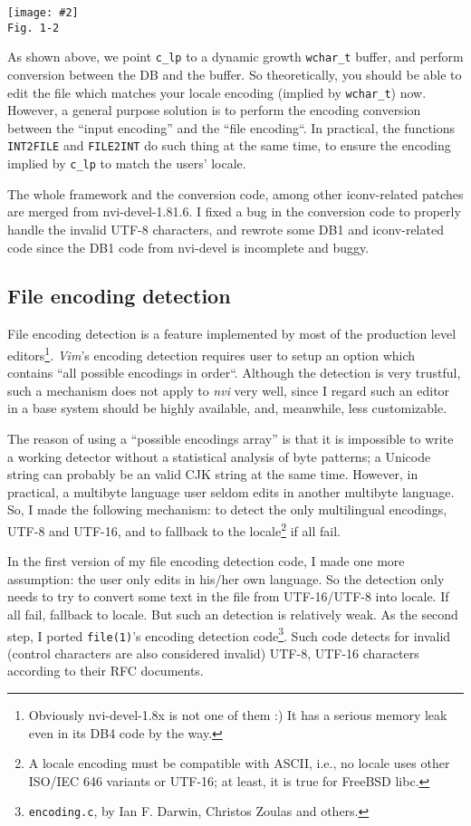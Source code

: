 \documentclass[11pt,twoside,a4paper]{article}
\newcommand{\fig}[3]{
	\begin{center}
	\texttt{[image: \#2]}\\
	\texttt{\small{Fig. #1}}
	\end{center}}
\begin{document}
\begin{mla}
\fig{1-2}{exf_2}{0.5}

As shown above, we point \verb|c_lp| to a dynamic growth \verb|wchar_t|
buffer, and perform conversion between the DB and the buffer. So
theoretically, you should be able to edit the file which matches your
locale encoding (implied by \verb|wchar_t|) now. However, a general purpose
solution is to perform the encoding conversion between the ``input encoding''
and the ``file encoding``. In practical, the functions \verb|INT2FILE|
and \verb|FILE2INT| do such thing at the same time, to ensure the encoding
implied by \verb|c_lp| to match the users' locale.

The whole framework and the conversion code, among other iconv-related patches
are merged from nvi-devel-1.81.6. I fixed a bug in the conversion code to
properly handle the invalid UTF-8 characters, and rewrote some DB1 and
iconv-related code since the DB1 code from nvi-devel is incomplete and buggy.

\subsection{File encoding detection}

File encoding detection is a feature implemented by most of the production
level editors\footnote{Obviously nvi-devel-1.8x is not one of them :) It has
a serious memory leak even in its DB4 code by the way.}.
\emph{Vim}'s encoding detection requires user to setup an option which
contains ``all possible encodings in order``. Although the detection is very
trustful, such a mechanism does not apply to \emph{nvi} very well, since I
regard such an editor in a base system should be highly available, and,
meanwhile, less customizable.

The reason of using a ``possible encodings array'' is that it is impossible
to write a working detector without a statistical analysis of byte patterns;
a Unicode string can probably be an valid CJK string at the same time.
However, in practical, a multibyte language user seldom edits in another
multibyte language. So, I made the following mechanism: to detect the only
multilingual encodings, UTF-8 and UTF-16, and to fallback to the
locale\footnote{A locale encoding must be compatible with ASCII, i.e.,
	no locale uses other ISO/IEC 646 variants or UTF-16; at least, it is true
	for FreeBSD libc.} if all fail.

In the first version of my file encoding detection code, I made one more
assumption: the user only edits in his/her own language. So the detection
only needs to try to convert some text in the file from UTF-16/UTF-8 into
locale. If all fail, fallback to locale. But such an detection is relatively
weak. As the second step, I ported \verb|file(1)|'s encoding detection
code\footnote{\texttt{encoding.c}, by Ian F. Darwin, Christos Zoulas
	and others.}. Such code detects for invalid (control characters are also
considered invalid) UTF-8, UTF-16 characters according to their RFC documents.


\end{mla}
\end{document}

